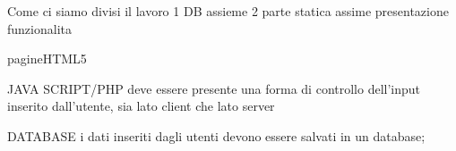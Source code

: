 Come ci siamo divisi il lavoro
1 DB assieme
2 parte statica assime
presentazione 
funzionalita


pagineHTML5


JAVA SCRIPT/PHP
deve essere presente una forma di controllo dell’input inserito dall’utente, sia lato client che lato server


DATABASE
i dati inseriti dagli utenti devono essere salvati in un database;
